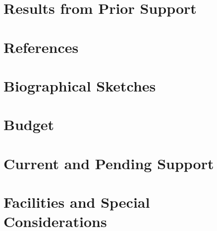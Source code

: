 \documentclass{article}
\begin{document}
\section{Results from Prior Support}
\section{References}
\section{Biographical Sketches}
\section{Budget}
\section{Current and Pending Support}
\section{Facilities and Special Considerations}
\end{document}
